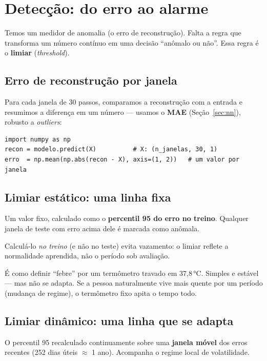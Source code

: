 \section{Detecção: do erro ao alarme}
\label{sec:deteccao}

Temos um medidor de anomalia (o erro de reconstrução). Falta a regra que
transforma um número contínuo em uma decisão ``anômalo ou não''. Essa regra é o
\textbf{limiar} (\emph{threshold}).

\subsection{Erro de reconstrução por janela}
Para cada janela de 30 passos, comparamos a reconstrução com a entrada e
resumimos a diferença em um número --- usamos o \textbf{MAE} (Seção~\ref{sec:nn}),
robusto a \emph{outliers}:

\begin{lstlisting}[caption={Erro de reconstrução (MAE) por janela.}]
import numpy as np
recon = modelo.predict(X)          # X: (n_janelas, 30, 1)
erro  = np.mean(np.abs(recon - X), axis=(1, 2))   # um valor por janela
\end{lstlisting}

\subsection{Limiar estático: uma linha fixa}
\begin{definicao}
Um valor fixo, calculado como o \textbf{percentil 95 do erro no treino}.
Qualquer janela de teste com erro acima dele é marcada como anômala.
\end{definicao}

Calculá-lo \emph{no treino} (e não no teste) evita vazamento: o limiar reflete a
normalidade aprendida, não o período sob avaliação.

\begin{intuicao}
É como definir ``febre'' por um termômetro travado em 37,8\,°C. Simples e
estável --- mas não se adapta. Se a pessoa naturalmente vive mais quente por um
período (mudança de regime), o termômetro fixo apita o tempo todo.
\end{intuicao}

\subsection{Limiar dinâmico: uma linha que se adapta}
\begin{definicao}
O percentil 95 recalculado continuamente sobre uma \textbf{janela móvel} dos
erros recentes (252 dias úteis $\approx$ 1 ano). Acompanha o regime local de
volatilidade.
\end{definicao}


